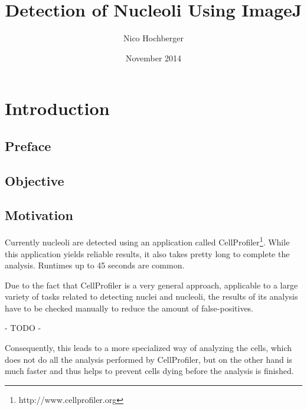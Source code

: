 \documentclass[a4paper, 11pt]{article}
\begin{document}

\nocite{*}

\title{Detection of Nucleoli Using ImageJ}
\author{Nico Hochberger}
\date{November 2014}
\maketitle

\newpage
\tableofcontents

\newpage
\listoffigures

\newpage
\listoftables

\newpage
\section{Introduction}

\subsection{Preface}

\subsection{Objective}

\subsection{Motivation}
Currently nucleoli are detected using an application called
CellProfiler\footnote{http://www.cellprofiler.org}. While this application
yields reliable results, it also takes pretty long to complete the analysis.
Runtimes up to 45 seconds are common.

Due to the fact that CellProfiler is a very general approach, applicable to a
large variety of tasks related to detecting nuclei and nucleoli, the results of
its analysis have to be checked manually to reduce the amount of
false-positives.

- TODO -

Consequently, this leads to a more specialized way of analyzing the cells, which
does not do all the analysis performed by CellProfiler, but on the other hand is
much faster and thus helps to prevent cells dying before the analysis is
finished.
\end{document}

